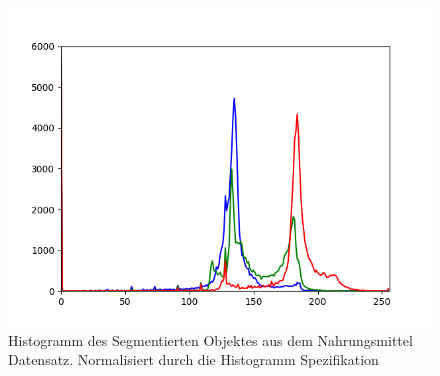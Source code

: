 \documentclass[a4paper,12pt,oneside]{article}
\begin{document}
\begin{figure}[htb]
\begin{minipage}[c]{0.08\textwidth}
\end{minipage}
\hfill
\begin{minipage}[c]{0.3\textwidth}
\includegraphics[width=\textwidth]{Sources/Bild3_HS_histo.png}
\end{minipage}
\caption{Histogramm des Segmentierten Objektes aus dem Nahrungsmittel Datensatz. Normalisiert durch die Histogramm Spezifikation}
\label{img:evalHS}
\end{figure}
\newpage
\end{document}
